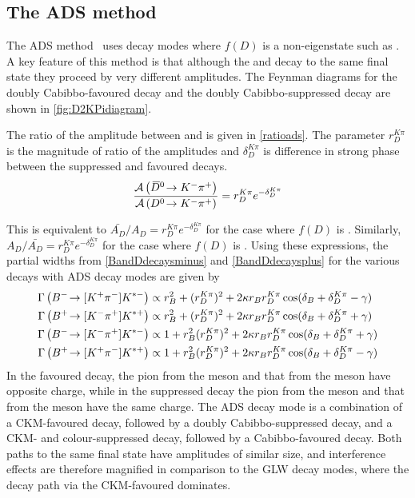 \subsection{The ADS method}
\label{sec:theory:ads}

The ADS method~\cite{ADS,ADS-2001} uses \D decay modes where $f(D)$ is a non-\CP eigenstate such as \decay{\D}{\Km\pip}. A key feature of this method is that although the \Dz and \Dzb decay to the same final state they proceed by very different amplitudes. The Feynman diagrams for the doubly Cabibbo-favoured \decay{\Dz}{\Km\pip} decay and the doubly Cabibbo-suppressed \decay{\Dzb}{\Kp\pim} decay are shown in \fig\ref{fig:D2KPidiagram}.


The ratio of the amplitude between \decay{\Dzb}{\Km\pip} and \decay{\Dz}{\Km\pip} is given in \eqn\ref{ratioads}. The parameter $r_D^{K\pi}$ is the magnitude of ratio of the amplitudes and $\delta_D^{K\pi}$ is difference in strong phase between the suppressed and favoured decays.
\begin{equation}
\frac{\mathcal{A}\left({{\kern 0.2em\overline{\kern -0.2em D}{}}{}^0}\!\rightarrow {\ensuremath{{K}^-}}{\ensuremath{{\pi}^+}}\right)}{\mathcal{A}\left({{D}^0}\!\rightarrow {\ensuremath{{K}^-}}{\ensuremath{{\pi}^+}}\right)} = r_D^{K\pi}e^{-\delta_D^{K\pi}}
\label{ratioads}
\end{equation}

This is equivalent to $\bar{A_{D}}/A_{D} = r_D^{K\pi}e^{-\delta_D^{K\pi}}$ for the case where $f(D)$ is \Km\pip. Similarly, $A_{D}/\bar{A_{D}} = r_D^{K\pi}e^{-\delta_D^{K\pi}}$ for the case where $f(D)$ is \Kp\pim. Using these expressions, the partial widths from \eqn\ref{BandDdecaysminus} and \ref{BandDdecaysplus} for the various \decay{\Bpm}{\D\Kstarpm} decays with ADS decay modes are given by
\begin{align}
\Gamma\left({{{B}^-}}\!\rightarrow [{{K}^+}{{\pi}^-}]{\ensuremath{{K}^{*-}}}\right) &\propto r_B^2 + (r_D^{K\pi})^2 + 2\kappa r_Br_D^{K\pi}\cos(\delta_B + \delta_D^{K\pi} - \gamma) \label{adsBdecaym} \\
\Gamma\left({{{B}^+}}\!\rightarrow [{{K}^-}{{\pi}^+}]{\ensuremath{{K}^{*+}}}\right) &\propto r_B^2 + (r_D^{K\pi})^2 + 2\kappa r_Br_D^{K\pi}\cos(\delta_B + \delta_D^{K\pi} + \gamma) \label{adsBdecayp} \\
\Gamma\left({{{B}^-}}\!\rightarrow [{{K}^-}{{\pi}^+}]{\ensuremath{{K}^{*-}}}\right) &\propto 1 + r_B^2(r_D^{K\pi})^2 + 2\kappa r_Br_D^{K\pi}\cos(\delta_B + \delta_D^{K\pi} + \gamma) \label{favBdecaym} \\
\Gamma\left({{{B}^+}}\!\rightarrow [{{K}^+}{{\pi}^-}]{\ensuremath{{K}^{*+}}}\right) &\propto 1 + r_B^2(r_D^{K\pi})^2 + 2\kappa r_Br_D^{K\pi}\cos(\delta_B + \delta_D^{K\pi} - \gamma) \label{favBdecayp} 
\end{align}
In the favoured decay, the pion from the \D meson and that from the \Kstarm meson have opposite charge, while in the suppressed decay the pion from the \D meson and that from the \Kstarm meson have the same charge. The ADS decay mode is a combination of a CKM-favoured \decay{\Bm}{\Dz\Kstarm} decay, followed by a doubly Cabibbo-suppressed \decay{\Dz}{\Kp\pim} decay, and a CKM- and colour-suppressed \decay{\Bm}{\Dzb\Kstarm} decay, followed by a Cabibbo-favoured \decay{\Dzb}{\Kp\pim} decay. Both paths to the same final state have amplitudes of similar size, and interference effects are therefore magnified in comparison to the GLW decay modes, where the decay path via the CKM-favoured \decay{\Bm}{\Dz\Kstarm} dominates.


